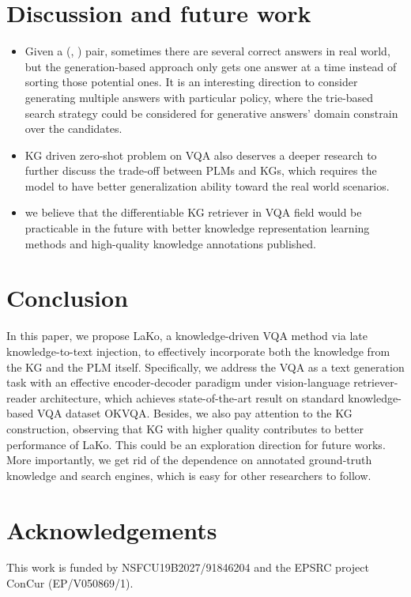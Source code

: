 \documentclass[sigconf]{acmart}
\begin{document}
\section{Discussion and future work}
\begin{itemize}
	\item Given a (, ) pair, sometimes there are several correct answers in real world, but the  generation-based approach only gets one answer at a time instead of sorting those potential ones. It is  an interesting direction to consider generating multiple answers with particular policy, where the trie-based search \cite{cormen2022introduction} strategy could be considered for generative answers' domain constrain over the candidates.
	\item KG driven zero-shot problem \cite{DBLP:conf/ijcai/ChenG0HPC21,DBLP:journals/corr/abs-2112-10006,DBLP:journals/corr/abs-2106-15047,DBLP:conf/www/GengC0PYYJC21} on VQA also deserves a deeper research to further discuss the trade-off between PLMs and KGs, which requires the model to have better generalization ability toward the real world scenarios.
	\item we believe that the differentiable KG retriever in VQA field would be practicable in the future with  better knowledge representation learning methods and high-quality knowledge annotations published. 
\end{itemize}
 
\section{Conclusion}
In this paper, we propose LaKo,
a knowledge-driven VQA method via late knowledge-to-text injection, to effectively incorporate both the knowledge from the KG and the PLM itself.
Specifically, we address the VQA as a text generation task with an effective encoder-decoder paradigm under vision-language retriever-reader architecture, which achieves state-of-the-art result on standard knowledge-based VQA dataset OKVQA.
Besides, we also pay attention to the KG construction, observing that KG with higher quality contributes to better performance of LaKo. This could be an exploration direction for future  works.
More importantly, we get rid of the dependence on annotated ground-truth knowledge and search engines, which is easy for other researchers to follow.


\section{Acknowledgements}
This work is funded by NSFCU19B2027/91846204 and the EPSRC project ConCur (EP/V050869/1).



\end{document}
